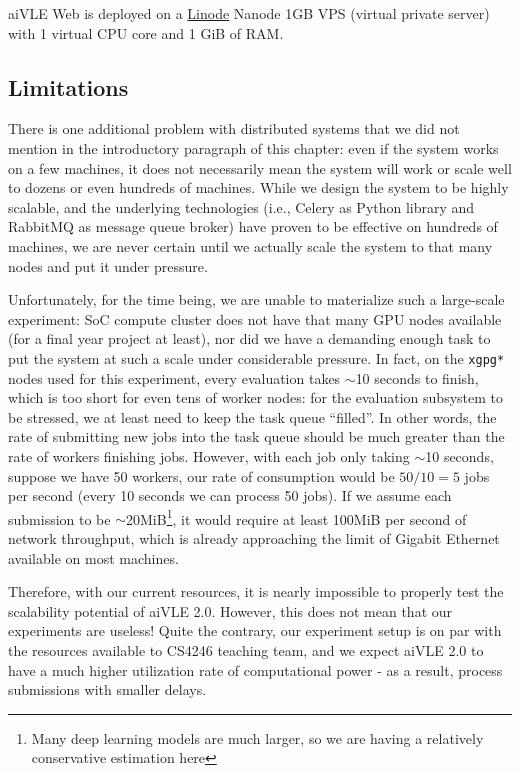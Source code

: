 aiVLE Web is deployed on a \href{https://linode.com/}{Linode} Nanode 1GB VPS (virtual private server) with 1 virtual CPU core and 1 GiB of RAM.

\subsection{Limitations}
\label{ss:deployment-limitations}
There is one additional problem with distributed systems that we did not mention in the introductory paragraph of this chapter: even if the system works on a few machines, it does not necessarily mean the system will work or scale well to dozens or even hundreds of machines. While we design the system to be highly scalable, and the underlying technologies (i.e., Celery as Python library and RabbitMQ as message queue broker) have proven to be effective on hundreds of machines, we are never certain until we actually scale the system to that many nodes and put it under pressure.

Unfortunately, for the time being, we are unable to materialize such a large-scale experiment: SoC compute cluster does not have that many GPU nodes available (for a final year project at least), nor did we have a demanding enough task to put the system at such a scale under considerable pressure. In fact, on the \texttt{xgpg*} nodes used for this experiment, every evaluation takes $\sim$10 seconds to finish, which is too short for even tens of worker nodes: for the evaluation subsystem to be stressed, we at least need to keep the task queue ``filled''. In other words, the rate of submitting new jobs into the task queue should be much greater than the rate of workers finishing jobs. However, with each job only taking $\sim$10 seconds, suppose we have 50 workers, our rate of consumption would be $50/10=5$ jobs per second (every 10 seconds we can process 50 jobs). If we assume each submission to be $\sim$20MiB\footnote{Many deep learning models are much larger, so we are having a relatively conservative estimation here}, it would require at least 100MiB per second of network throughput, which is already approaching the limit of Gigabit Ethernet available on most machines.

Therefore, with our current resources, it is nearly impossible to properly test the scalability potential of aiVLE 2.0. However, this does not mean that our experiments are useless! Quite the contrary, our experiment setup is on par with the resources available to CS4246 teaching team, and we expect aiVLE 2.0 to have a much higher utilization rate of computational power - as a result, process submissions with smaller delays.

